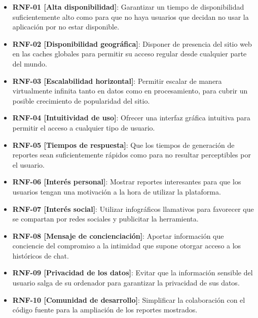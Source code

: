 
\begin{itemize}
    \item \textbf{RNF-01 [Alta disponibilidad]}: Garantizar un tiempo de disponibilidad suficientemente alto como para que no haya usuarios que decidan no usar la aplicación por no estar disponible.
    \item \textbf{RNF-02 [Disponibilidad geográfica]}: Disponer de presencia del sitio web en las caches globales para permitir su acceso regular desde cualquier parte del mundo.
    \item \textbf{RNF-03 [Escalabilidad horizontal]}: Permitir escalar de manera virtualmente infinita tanto en datos como en procesamiento, para cubrir un posible crecimiento de popularidad del sitio.
    \item \textbf{RNF-04 [Intuitividad de uso]}: Ofrecer una interfaz gráfica intuitiva para permitir el acceso a cualquier tipo de usuario.
    \item \textbf{RNF-05 [Tiempos de respuesta]}: Que los tiempos de generación de reportes sean suficientemente rápidos como para no resultar perceptibles por el usuario.
    \item \textbf{RNF-06 [Interés personal]}: Mostrar reportes interesantes para que los usuarios tengan una motivación a la hora de utilizar la plataforma.
    \item \textbf{RNF-07 [Interés social]}: Utilizar infográficos llamativos para favorecer que se compartan por redes sociales y publicitar la herramienta.
    \item \textbf{RNF-08 [Mensaje de concienciación]}: Aportar información que conciencie del compromiso a la intimidad que supone otorgar acceso a los históricos de chat.
    \item \textbf{RNF-09 [Privacidad de los datos]}: Evitar que la información sensible del usuario salga de su ordenador para garantizar la privacidad de sus datos.
    \item \textbf{RNF-10 [Comunidad de desarrollo]}: Simplificar la colaboración con el código fuente para la ampliación de los reportes mostrados.
\end{itemize}
